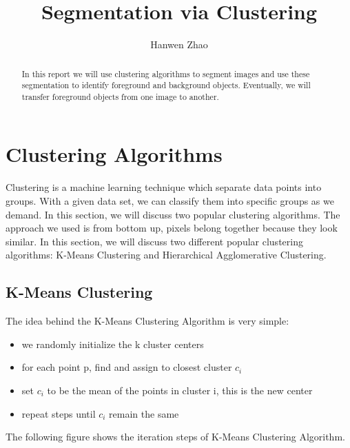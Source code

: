 \documentclass[12pt]{article}
\title{Segmentation via Clustering}
\author{Hanwen Zhao}
\date{}
\begin{document}
\maketitle

\begin{abstract}
In this report we will use clustering algorithms to segment images and use these segmentation to identify foreground and background objects. Eventually, we will transfer foreground objects from one image to another.
\end{abstract}

\section{Clustering Algorithms}
Clustering is a machine learning technique which separate data points into groups. With a given data set, we can classify them into specific groups as we demand. In this section, we will discuss two popular clustering algorithms. The approach we used is from bottom up, pixels belong together because they look similar. In this section, we will discuss two different popular clustering algorithms: K-Means Clustering and Hierarchical Agglomerative Clustering.

\subsection{K-Means Clustering}
The idea behind the K-Means Clustering Algorithm is very simple: 

\begin{itemize}
	\item we randomly initialize the k cluster centers
	\item for each point p, find and assign to closest cluster $c_i$
  	\item set $c_i$ to be the mean of the points in cluster i, this is the new center
  	\item repeat steps until $c_i$ remain the same
\end{itemize}
\noindent
The following figure shows the iteration steps of K-Means Clustering Algorithm.
\end{document}
